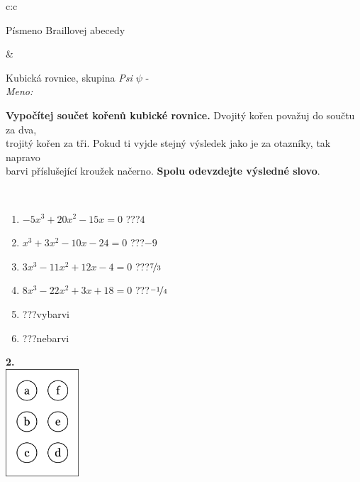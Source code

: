 \documentclass[10pt]{report}
\begin{document}
\begin{tabular}{c:c}
\begin{minipage}[c][104.5mm][t]{0.5\linewidth}
\begin{center}
\begin{minipage}{0.20\linewidth}
\begin{center}
{\small Písmeno Braillovej abecedy}
\end{center}
\end{minipage}
\end{center}
\end{minipage}
&
\begin{minipage}[c][104.5mm][t]{0.5\linewidth}
\begin{center}
\vspace{7mm}
{\huge Kubická rovnice, skupina \textit{Psi $\psi$} -}\\[5mm]
\textit{Meno:}\phantom{xxxxxxxxxxxxxxxxxxxxxxxxxxxxxxxxxxxxxxxxxxxxxxxxxxxxxxxxxxxxxxxxx}\\[5mm]
\begin{minipage}{0.95\linewidth}
\textbf{Vypočítej součet kořenů kubické rovnice.} Dvojitý kořen považuj do součtu za dva,\\trojitý kořen za tři. Pokud ti vyjde stejný výsledek jako je za otazníky, tak napravo\\barvi příslušející kroužek načerno. \textbf{Spolu odevzdejte výsledné slovo}.
\end{minipage}
\\[1mm]
\begin{minipage}{0.79\linewidth}
\begin{center}
\begin{varwidth}{\linewidth}
\begin{enumerate}
\Large
\item $-5x^3+20x^2-15x=0$\quad \dotfill\; ???\;\dotfill \quad $4$
\item $x^3+3x^2-10x-24=0$\quad \dotfill\; ???\;\dotfill \quad $-9$
\item $3x^3-11x^2+12x-4=0$\quad \dotfill\; ???\;\dotfill \quad $\nicefrac{7}{3}$
\item $8x^3-22x^2+3x+18=0$\quad \dotfill\; ???\;\dotfill \quad $\nicefrac{-1}{4}$
\item \quad \dotfill\; ???\;\dotfill \quad vybarvi
\item \quad \dotfill\; ???\;\dotfill \quad nebarvi
\end{enumerate}
\end{varwidth}
\end{center}
\end{minipage}
\begin{minipage}{0.20\linewidth}
\begin{center}
{\Huge\bfseries 2.} \\[2mm]
\includegraphics[height=40mm]{../images/braille.png}

\end{center}
\end{minipage}
\end{center}
\end{minipage}
\end{tabular}
\end{document}
